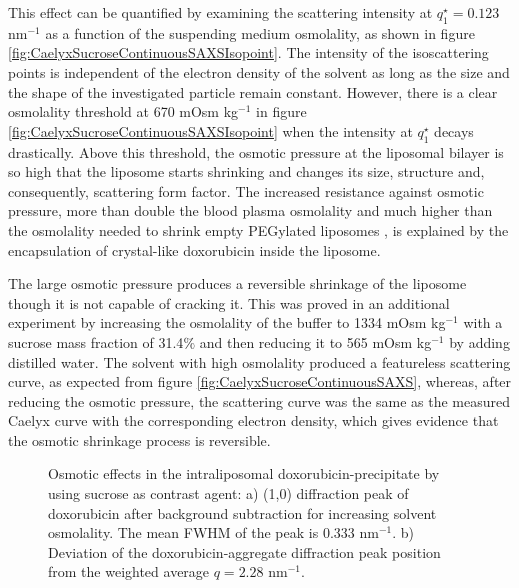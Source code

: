 This effect can be quantified by examining the scattering intensity at $q^{\star}_1 = 0.123$ nm$^{-1}$ as a function of the suspending medium osmolality, as shown in figure \ref{fig:CaelyxSucroseContinuousSAXSIsopoint}. The intensity of the isoscattering points is independent of the electron density of the solvent as long as the size and the shape of the investigated particle remain constant. However, there is a clear osmolality threshold at 670 mOsm kg$^{-1}$ in figure \ref{fig:CaelyxSucroseContinuousSAXSIsopoint} when the intensity at $q^{\star}_1$ decays drastically. Above this threshold, the osmotic pressure at the liposomal bilayer is so high that the liposome starts shrinking and changes its size, structure and, consequently, scattering form factor. The increased resistance against osmotic pressure, more than double the blood plasma osmolality and much higher than the osmolality needed to shrink empty PEGylated liposomes \citep{varga_osmotic_2014}, is explained by the encapsulation of crystal-like doxorubicin inside the liposome.

The large osmotic pressure produces a reversible shrinkage of the liposome though it is not capable of cracking it. This was proved in an additional experiment by increasing the osmolality of the buffer to 1334 mOsm kg$^{-1}$ with a sucrose mass fraction of 31.4$\%$ and then reducing it to 565 mOsm kg$^{-1}$ by adding distilled water. The solvent with high osmolality produced a featureless scattering curve, as expected from figure \ref{fig:CaelyxSucroseContinuousSAXS}, whereas, after reducing the osmotic pressure, the scattering curve was the same as the measured Caelyx curve with the corresponding electron density, which gives evidence that the osmotic shrinkage process is reversible.

\begin{figure}
	\centering
		\qquad
		\caption[Osmotic effects in the intraliposomal doxorubicin-precipitate.]{Osmotic effects in the intraliposomal doxorubicin-precipitate by using sucrose as contrast agent: a) (1,0) diffraction peak of doxorubicin after background subtraction for increasing solvent osmolality. The mean FWHM of the peak is 0.333  nm$^{-1}$. b) Deviation of the doxorubicin-aggregate diffraction peak position from the weighted average $q=2.28$ nm$^{-1}$.}
\end{figure}

